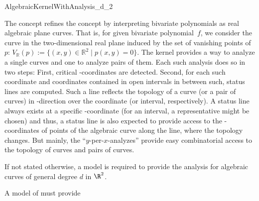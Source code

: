 \begin{ccRefConcept}{AlgebraicKernelWithAnalysis_d_2} 

\ccDefinition

The  concept refines
the  concept by interpreting bivariate polynomials
as real algebraic plane curves. That is, for given bivariate polynomial~$f$,
we consider the curve in the two-dimensional real plane induced by the set of
vanishing points of~$p$: $V_\mathbb{R}(p) := \{(x,y) \in \mathbb{R}^2
\mid p(x,y) = 0 \}$. The kernel provides a way to analyze a single
curves and one to analyze pairs of them. Each such analysis does so in two
steps: First, critical -coordinates are detected. Second, for each such
coordinate and coordinates contained in open
intervals in between such, status lines are computed. Such a line reflects
the topology of a curve (or a pair of curves) in -direction
over the coordinate (or interval, respectively). A status line always exists at
a specific -coordinate (for an interval, a representative might be
chosen) and thus, a status line is also expected to provide access to the
-coordinates of points of the algebraic curve along the line, where the
topology changes. But mainly, the ``$y$-per-$x$-analyzes'' provide easy
combinatorial access to the topology of curves and pairs of curves. 

If not stated otherwise, a model is required to 
provide the analysis for algebraic curves of general degree $d$ in $\R^2$.

\ccRefines
{}

\ccTypes

A model of  must provide

\ccGlue
{}

\ccHasModels


\ccSeeAlso



\end{ccRefConcept}
